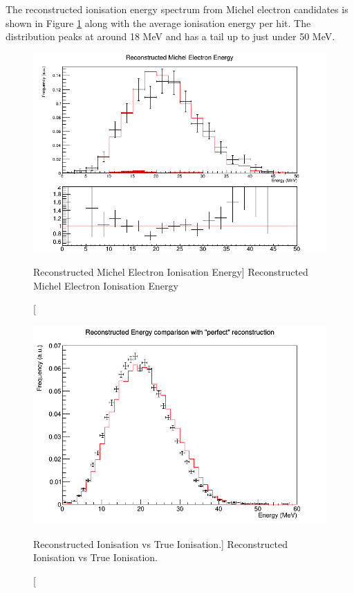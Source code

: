 The reconstructed ionisation energy spectrum from Michel electron candidates is
shown in Figure \ref{fig:michel_ion_reco} along with the average ionisation
energy per hit. The distribution peaks at around 18 MeV and has a tail up to 
just under 50 MeV.
\begin{figure}
	\centering
	\includegraphics[width=\textwidth]{figures/michel_ion_reco.png}
	\caption
	[Reconstructed Michel Electron Ionisation Energy]
	{Reconstructed Michel Electron Ionisation Energy}
	\label{fig:michel_ion_reco}
\end{figure}


\begin{figure}
	\centering
	\includegraphics[width=\textwidth, height=0.68\textwidth]{figures/reco_v_ion.png}
	\caption
	[Reconstructed Ionisation vs True Ionisation.]
	{Reconstructed Ionisation vs True Ionisation.}
	\label{fig:reco_v_ion}
\end{figure}

